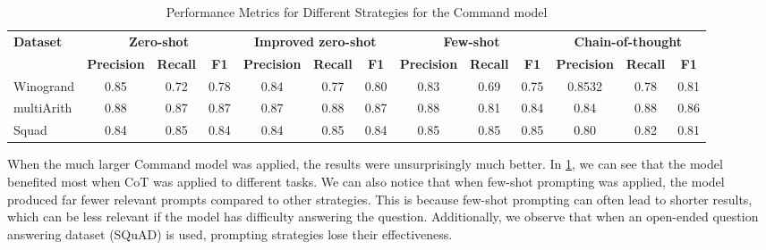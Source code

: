 \documentclass[fleqn,moreauthors,10pt]{ds_report}
\begin{document}
\begin{table}[!htbp]
\centering
\begin{adjustbox}{width=\columnwidth}
\begin{tabular}{@{}lcccccccccccc@{}}
\toprule
\textbf{Dataset} & \multicolumn{3}{c}{\textbf{Zero-shot}} & \multicolumn{3}{c}{\textbf{Improved zero-shot}} & \multicolumn{3}{c}{\textbf{Few-shot}} & \multicolumn{3}{c}{\textbf{Chain-of-thought}} \\
 & \textbf{Precision} & \textbf{Recall} & \textbf{F1} & \textbf{Precision} & \textbf{Recall} & \textbf{F1} & \textbf{Precision} & \textbf{Recall} & \textbf{F1} & \textbf{Precision} & \textbf{Recall} & \textbf{F1} \\ \midrule
Winogrand & 0.85 & 0.72 & 0.78 & 0.84 & 0.77 & 0.80 & 0.83 & 0.69 & 0.75 & 0.8532 & 0.78 & 0.81 \\
multiArith & 0.88 &  0.87 & 0.87 & 0.87 & 0.88 & 0.87 & 0.88 & 0.81 & 0.84 & 0.84 & 0.88 & 0.86 \\ 
Squad & 0.84 &  0.85 & 0.84 & 0.84 & 0.85 & 0.84 & 0.85 & 0.85 & 0.85 & 0.80 & 0.82 & 0.81 \\
\bottomrule
\end{tabular}
\end{adjustbox}
\caption{Performance Metrics for Different Strategies for the Command model}
\label{tab:performance_metrics_coomando}
\end{table}

When the much larger Command model was applied, the results were unsurprisingly much better. In \ref{tab:performance_metrics_coomando}, we can see that the model benefited most when CoT was applied to different tasks. We can also notice that when few-shot prompting was applied, the model produced far fewer relevant prompts compared to other strategies. This is because few-shot prompting can often lead to shorter results, which can be less relevant if the model has difficulty answering the question. Additionally, we observe that when an open-ended question answering dataset (SQuAD) is used, prompting strategies lose their effectiveness.
\end{document}
